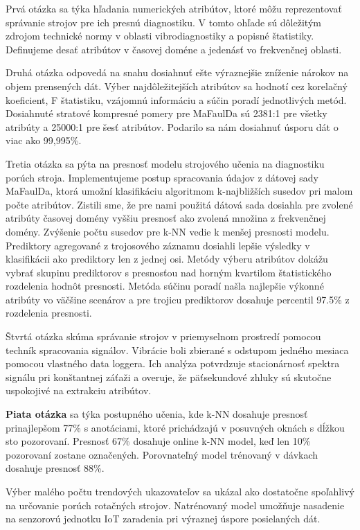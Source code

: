 Prvá otázka sa týka hľadania numerických atribútov, ktoré môžu reprezentovať správanie strojov pre ich presnú diagnostiku. V tomto ohľade sú dôležitým zdrojom technické normy v oblasti vibrodiagnostiky a popisné štatistiky. Definujeme desať atribútov v časovej doméne a jedenásť vo frekvenčnej oblasti.

Druhá otázka odpovedá na snahu dosiahnuť ešte výraznejšie zníženie nárokov na objem prensených dát. Výber najdôležitejších atribútov sa hodnotí cez korelačný koeficient, F štatistiku, vzájomnú informáciu a súčin poradí jednotlivých metód. Dosiahnuté stratové kompresné pomery pre MaFaulDa sú 2381:1 pre všetky atribúty a 25000:1 pre šesť atribútov. Podarilo sa nám dosiahnuť úsporu dát o viac ako 99,995\%.

Tretia otázka sa pýta na presnosť modelu strojového učenia na diagnostiku porúch stroja. Implementujeme postup spracovania údajov z dátovej sady MaFaulDa, ktorá umožní klasifikáciu algoritmom k-najbližších susedov pri malom počte atribútov.  Zistili sme, že pre nami použitá dátová sada dosiahla pre zvolené atribúty časovej domény vyššiu presnosť ako zvolená množina z frekvenčnej domény. Zvýšenie počtu susedov pre k-NN vedie k menšej presnosti modelu. Prediktory agregované z trojosového záznamu dosiahli lepšie výsledky v klasifikácii ako prediktory len z jednej osi. Metódy výberu atribútov dokážu vybrať skupinu prediktorov s presnosťou nad horným kvartilom štatistického rozdelenia hodnôt presnosti. Metóda súčinu poradí našla najlepšie výkonné atribúty vo väčšine scenárov a pre trojicu prediktorov dosahuje percentil 97.5\% z rozdelenia presnosti.

Štvrtá otázka skúma správanie strojov v priemyselnom prostredí pomocou techník spracovania signálov. Vibrácie boli zbierané s odstupom jedného mesiaca pomocou vlastného data loggera. Ich analýza potvrdzuje stacionárnosť spektra signálu pri konštantnej záťaži a overuje, že päťsekundové zhluky sú skutočne uspokojivé na extrakciu atribútov.

\textbf{Piata otázka} sa týka postupného učenia, kde k-NN dosahuje presnosť prinajlepšom 77\% s anotáciami, ktoré prichádzajú v posuvných oknách s dĺžkou sto pozorovaní. Presnosť 67\% dosahuje online k-NN model, keď len 10\% pozorovaní zostane označených. Porovnateľný model trénovaný v dávkach dosahuje presnosť 88\%.

Výber malého počtu trendových ukazovateľov sa ukázal ako dostatočne spoľahlivý na určovanie porúch rotačných strojov. Natrénovaný model umožňuje nasadenie na senzorovú jednotku IoT zaradenia pri výraznej úspore posielaných dát.
\clearpage
